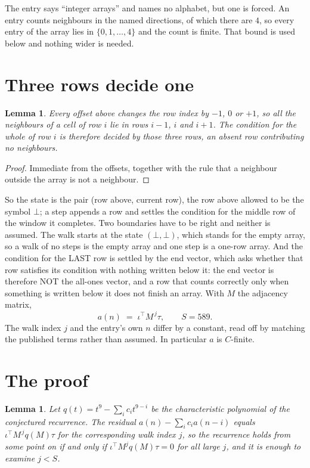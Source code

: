 \documentclass[11pt,a4paper]{article}
\theoremstyle{plain}
\newtheorem{lemma}[theorem]{Lemma}
\theoremstyle{definition}
\begin{document}
The entry says ``integer arrays'' and names no alphabet, but one is forced. An entry counts
neighbours in the named directions, of which there are $4$, so every entry of the array
lies in $\{0,1,\dots,4\}$ and the count is finite. That bound is used below and
nothing wider is needed.

\section{Three rows decide one}

\begin{lemma}\label{lem:win}
Every offset above changes the row index by $-1$, $0$ or $+1$, so all the neighbours of a cell
of row $i$ lie in rows $i-1$, $i$ and $i+1$. The condition for the whole of row $i$ is
therefore decided by those three rows, an absent row contributing no neighbours.
\end{lemma}

\begin{proof}
Immediate from the offsets, together with the rule that a neighbour outside the array is not a
neighbour.
\end{proof}

So the state is the pair (row above, current row), the row above allowed to be the symbol
$\bot$; a step appends a row and settles the condition for the middle row of the window it
completes. Two boundaries have to be right and neither is assumed. The walk starts at the state
$(\bot,\bot)$, which stands for the empty array, so a walk of no steps is the empty array and
one step is a one-row array. And the condition for the LAST row is settled by the end vector,
which asks whether that row satisfies its condition with nothing written below it: the end
vector is therefore NOT the all-ones vector, and a row that counts correctly only when
something is written below it does not finish an array. With $M$ the adjacency matrix,
\[
a(n)\;=\;\iota^{\!\top}M^{\,j}\tau ,\qquad S=589.
\]
The walk index $j$ and the entry's own $n$ differ by a constant, read off by matching the
published terms rather than assumed. In particular $a$ is $C$-finite.

\section{The proof}

\begin{lemma}\label{lem:crit}
Let $q(t)=t^{9}-\sum_i c_it^{9-i}$ be the characteristic polynomial of the
conjectured recurrence. The residual $a(n)-\sum_ic_ia(n-i)$ equals
$\iota^{\!\top}M^{\,j}q(M)\tau$ for the corresponding walk index $j$, so the recurrence
holds from some point on if and only if $\iota^{\!\top}M^{j}q(M)\tau=0$ for all large $j$,
and it is enough to examine $j<S$.
\end{lemma}
\end{document}
